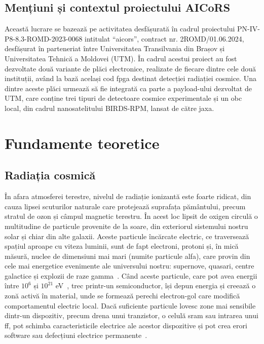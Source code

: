 \documentclass[12pt,a4paper]{report}
\begin{document}
\section{Mențiuni și contextul proiectului AICoRS}
Această lucrare se bazează pe activitatea desfășurată în cadrul proiectului PN-IV-P8-8.3-ROMD-2023-0068 intitulat \enquote{\gls{aicors}}, contract nr. 2ROMD/01.06.2024, desfășurat în parteneriat între Universitatea Transilvania din Brașov și Universitatea Tehnică a Moldovei (UTM). În cadrul acestui proiect au fost dezvoltate două variante de plăci electronice, realizate de fiecare dintre cele două instituții, având la bază același cod \gls{fpga} destinat detecției radiației cosmice. Una dintre aceste plăci urmează să fie integrată ca parte a payload-ului dezvoltat de UTM, care conține trei tipuri de detectoare cosmice experimentale și un \gls{obc} local, din cadrul nanosatelitului BIRDS-RPM, lansat de către \gls{jaxa}.


\chapter{Fundamente teoretice}
\section{Radiația cosmică}%
\label{cosmic_radiation_theory}
În afara atmosferei terestre, nivelul de radiație ionizantă este foarte ridicat, din cauza lipsei scuturilor naturale care protejează suprafața pământului, precum stratul de ozon și câmpul magnetic terestru. În acest loc lipsit de oxigen circulă o multitudine de particule provenite de la soare, din exteriorul sistemului nostru solar și chiar din alte galaxii. Aceste particule încărcate electric, ce traversează spațiul aproape cu viteza luminii, sunt de fapt electroni, protoni și, în mică măsură, nuclee de dimensiuni mai mari (numite particule alfa), care provin din cele mai energetice evenimente ale universului nostru: supernove, quasari, centre galactice și explozii de raze gamma~\cite{nasa_blog_radiation}.
Când aceste particule, care pot avea energii între \(10^6\) și \(10^{21}\) eV~\cite{cosmic_rays_energy}, trec printr-un semiconductor, își depun energia și creează o zonă activă în material, unde se formează perechi electron-gol care modifică comportamentul electric local. Dacă suficiente particule lovesc zone mai sensibile dintr-un dispozitiv, precum drena unui tranzistor, o celulă \gls{sram} sau intrarea unui \gls{ff}, pot schimba caracteristicile electrice ale acestor dispozitive și pot crea erori software sau defecțiuni electrice permanente~\cite{fpga_radiation_effects}. 
\end{document}
